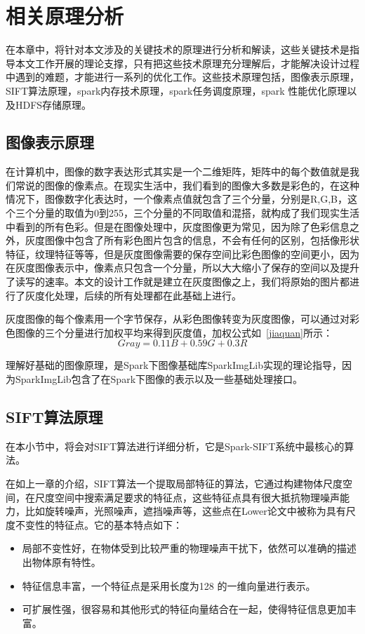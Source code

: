 ﻿\chapter{相关原理分析}
\label{xiangguanyuanli}
在本章中，将针对本文涉及的关键技术的原理进行分析和解读，这些关键技术是指导本文工作开展的理论支撑，只有把这些技术原理充分理解后，才能解决设计过程中遇到的难题，才能进行一系列的优化工作。这些技术原理包括，图像表示原理，SIFT算法原理，spark内存技术原理，spark任务调度原理，spark 性能优化原理以及HDFS存储原理。
\section{图像表示原理}
在计算机中，图像的数字表达形式其实是一个二维矩阵，矩阵中的每个数值就是我们常说的图像的像素点。在现实生活中，我们看到的图像大多数是彩色的，在这种情况下，图像数字化表达时，一个像素点值就包含了三个分量，分别是R,G,B，这个三个分量的取值为0到255，三个分量的不同取值和混搭，就构成了我们现实生活中看到的所有色彩。但是在图像处理中，灰度图像更为常见，因为除了色彩信息之外，灰度图像中包含了所有彩色图片包含的信息，不会有任何的区别，包括像形状特征，纹理特征等等，但是灰度图像需要的保存空间比彩色图像的空间更小，因为在灰度图像表示中，像素点只包含一个分量，所以大大缩小了保存的空间以及提升了读写的速率。本文的设计工作就是建立在灰度图像之上，我们将原始的图片都进行了灰度化处理，后续的所有处理都在此基础上进行。

灰度图像的每个像素用一个字节保存，从彩色图像转变为灰度图像，可以通过对彩色图像的三个分量进行加权平均来得到灰度值，加权公式如~\ref{jiaquan}所示：
\begin{equation}\label{jiaquan}
 Gray = 0.11B + 0.59G + 0.3R
\end{equation}

理解好基础的图像原理，是Spark下图像基础库SparkImgLib实现的理论指导，因为SparkImgLib包含了在Spark下图像的表示以及一些基础处理接口。
\section{SIFT算法原理}
\label{sec:sift}
在本小节中，将会对SIFT算法进行详细分析，它是Spark-SIFT系统中最核心的算法。

在如上一章的介绍，SIFT算法一个提取局部特征的算法，它通过构建物体尺度空间，在尺度空间中搜索满足要求的特征点，这些特征点具有很大抵抗物理噪声能力，比如旋转噪声，光照噪声，遮挡噪声等，这些点在Lower论文中被称为具有尺度不变性的特征点。它的基本特点如下：
\begin{itemize}
\item 局部不变性好，在物体受到比较严重的物理噪声干扰下，依然可以准确的描述出物体原有特性。
\item 特征信息丰富，一个特征点是采用长度为128 的一维向量进行表示。
\item 可扩展性强，很容易和其他形式的特征向量结合在一起，使得特征信息更加丰富。
\end{itemize}

